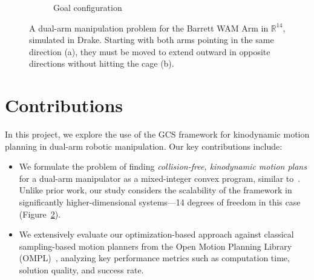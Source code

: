 \documentclass[conference]{IEEEtran}
\begin{document}
\begin{figure}[!t]
\begin{subfigure}[b]{0.23\textwidth}
        \captionsetup{justification=centering}
        \caption{Goal configuration}
        \label{subfig:cage_goal_orbit}
    \end{subfigure}
    \caption{A dual-arm manipulation problem for the Barrett WAM Arm in $\mathbb{R}^{14}$, simulated in Drake. Starting with both arms pointing in the same direction (a), they must be moved to extend outward in opposite directions without hitting the cage (b).}
    \label{fig:simulation}
\end{figure}

\section{Contributions}
In this project, we explore the use of the GCS framework for kinodynamic motion planning in dual-arm robotic manipulation.
%
Our key contributions include:
\begin{itemize}
    \item We formulate the problem of finding \textit{collision-free, kinodynamic motion plans} for a dual-arm manipulator as a mixed-integer convex program, similar to~\cite{marcucci2023motion}.
    Unlike prior work, our study considers the scalability of the framework in significantly higher-dimensional systems---14 degrees of freedom in this case (Figure~\ref{fig:simulation}).
    \item We extensively evaluate our optimization-based approach against classical sampling-based motion planners from the Open Motion Planning Library (OMPL)~\cite{sucan2012open}, analyzing key performance metrics such as computation time, solution quality, and success rate.
\end{itemize}



\end{document}
